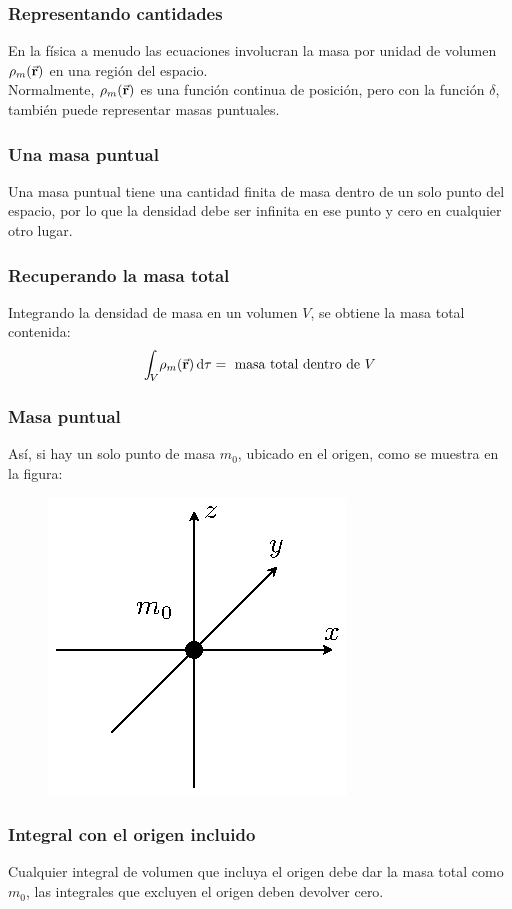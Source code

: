\documentclass[12pt]{beamer}
\begin{document}
\begin{frame}
\frametitle{Representando cantidades}
En la física a menudo las ecuaciones involucran la masa por unidad de volumen $\rho_{m} (\va{r})$ en una región del espacio.
\\
\bigskip
\pause
Normalmente, $\rho_{m} (\va{r})$ es una función continua de posición, pero con la función $\delta$, también puede representar masas puntuales.
\end{frame}
\begin{frame}
\frametitle{Una masa puntual}
Una masa puntual tiene una cantidad finita de masa dentro de un solo punto del espacio, por lo que la densidad debe ser infinita en ese punto y cero en cualquier otro lugar.
\end{frame}
\begin{frame}
\frametitle{Recuperando la masa total}
Integrando la densidad de masa en un volumen $V$, se obtiene la masa total contenida:
\pause
\begin{align}
    \scaleint{5ex}_{\bs V} \rho_{m} (\va{r}) \dd{\tau} = \mbox{ masa total dentro de } V
    \label{eq:ecuacion_05_05}
    \end{align}
\end{frame}
\begin{frame}
\frametitle{Masa puntual}
Así, si hay un solo punto de masa $m_{0}$, ubicado en el origen, como se muestra en la figura:
\pause
\begin{figure}[H]
    \centering
    \includegraphics[scale=1.3]{Imagenes/delta_Dirac_Masa_Puntual.eps}
    \label{fig:figura_05_04}
\end{figure}
\end{frame}
\begin{frame}
\frametitle{Integral con el origen incluido}
Cualquier integral de volumen que incluya el origen debe dar la masa total como $m_{0}$, las integrales que excluyen el origen deben devolver cero. 
\end{frame}
\end{document}
